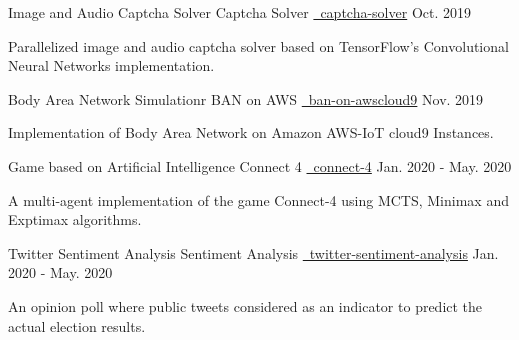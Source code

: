\begin{cventries}
   \cventry
    {Image and Audio Captcha Solver}
    {Captcha Solver}
    {\href{https://github.com/mukeshmk/image-audio-captcha}{\faGithubSquare\ captcha-solver}}
    {Oct. 2019}
    {
      \begin{cvitems}
        \item {Parallelized image and audio captcha solver based on TensorFlow’s Convolutional Neural Networks implementation.}
      \end{cvitems}
    }
  \cventry
    {Body Area Network Simulationr}
    {BAN on AWS}
    {\href{https://github.com/mukeshmk/ban-on-awscloud9}{\faGithubSquare\ ban-on-awscloud9}}
    {Nov. 2019}
    {
      \begin{cvitems}
        \item {Implementation of Body Area Network on Amazon AWS-IoT cloud9 Instances.}
      \end{cvitems}
    }
  \cventry
    {Game based on Artificial Intelligence}
    {Connect 4}
    {\href{https://github.com/mukeshmk/cs7is2-ai-group-proj}{\faGithubSquare\ connect-4}}
    {Jan. 2020 - May. 2020}
    {
      \begin{cvitems}
        \item {A multi-agent implementation of the game Connect-4 using MCTS, Minimax and Exptimax algorithms.}
      \end{cvitems}
    }
  \cventry
    {Twitter Sentiment Analysis}
    {Sentiment Analysis}
    {\href{https://github.com/mukeshmk/twitter-sentiment-analysis}{\faGithubSquare\ twitter-sentiment-analysis}}
    {Jan. 2020 - May. 2020}
    {
      \begin{cvitems}
        \item {An opinion poll where public tweets considered as an indicator to predict the actual election results.}
      \end{cvitems}
    }
\end{cventries}

